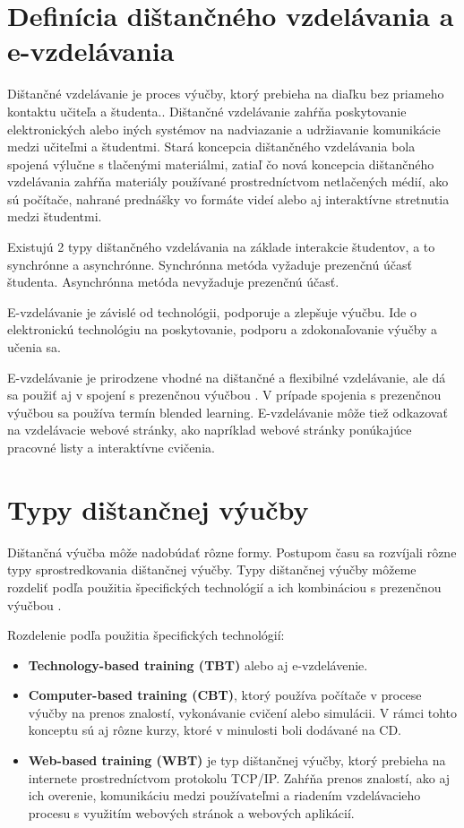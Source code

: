 \documentclass[10pt,oneside,slovak,a4paper]{article}
\begin{document}
\section{Definícia dištančného vzdelávania a e-vzdelávania}
\label{rozdiely}
Dištančné vzdelávanie je proces výučby, ktorý prebieha na diaľku bez priameho kontaktu učiteľa a študenta.\cite{India}.
Dištančné vzdelávanie zahŕňa poskytovanie elektronických alebo iných systémov na nadviazanie a udržiavanie komunikácie medzi učiteľmi a študentmi.
Stará koncepcia dištančného vzdelávania bola spojená výlučne s tlačenými materiálmi, zatiaľ čo nová koncepcia dištančného vzdelávania zahŕňa materiály používané prostredníctvom netlačených médií, ako sú počítače, nahrané prednášky vo formáte videí alebo aj interaktívne stretnutia medzi študentmi.

Existujú 2 typy dištančného vzdelávania na základe interakcie študentov, a to synchrónne a asynchrónne.
Synchrónna metóda vyžaduje prezenčnú účasť študenta.
Asynchrónna metóda nevyžaduje prezenčnú účasť.

E-vzdelávanie je závislé od technológii, podporuje a zlepšuje výučbu. Ide o elektronickú technológiu na poskytovanie, podporu a zdokonaľovanie výučby a učenia sa. 

E-vzdelávanie je prirodzene vhodné na dištančné a flexibilné vzdelávanie, ale dá sa použiť aj v spojení s prezenčnou výučbou \cite{elearningDef}.
V prípade spojenia s prezenčnou výučbou sa používa termín blended learning. 
E-vzdelávanie môže tiež odkazovať na vzdelávacie webové stránky, ako napríklad webové stránky ponúkajúce pracovné listy a interaktívne cvičenia.


\section{Typy dištančnej výučby}
\label{typy}
Dištančná výučba môže nadobúdať rôzne formy. Postupom času sa rozvíjali rôzne typy sprostredkovania dištančnej výučby. Typy dištančnej výučby môžeme rozdeliť podľa použitia
špecifických technológií a ich kombináciou s prezenčnou výučbou \cite{WiktorzakKotowski}.

Rozdelenie podľa použitia špecifických technológií:
\begin{itemize}
	\item \textbf{Technology-based training (TBT)} alebo aj e-vzdelávenie.
	\item \textbf{Computer-based training (CBT)}, ktorý používa počítače v procese výučby na prenos znalostí, vykonávanie cvičení alebo simulácii. V rámci tohto konceptu sú aj rôzne kurzy, ktoré v minulosti boli dodávané na CD.
	\item \textbf{Web-based training (WBT)} je typ dištančnej výučby, ktorý prebieha na internete prostredníctvom protokolu TCP/IP. Zahŕňa prenos znalostí, ako aj ich overenie, komunikáciu medzi používateľmi a riadením vzdelávacieho procesu s využitím webových stránok a webových aplikácií.
\end{itemize}
\end{document}
